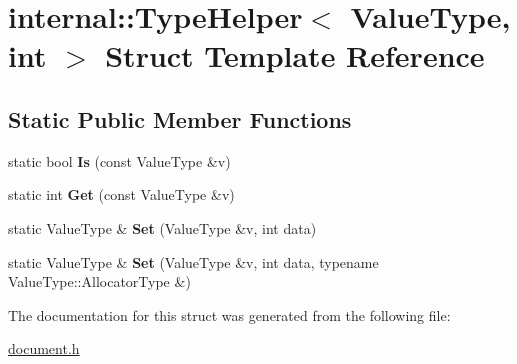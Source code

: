 \hypertarget{a02032}{}\section{internal\+:\+:Type\+Helper$<$ Value\+Type, int $>$ Struct Template Reference}
\label{a02032}
\subsection*{Static Public Member Functions}
\begin{DoxyCompactItemize}
\item 
\mbox{\label{a02032_aa17ef940501aac12fd7934ef979c607e}} 
static bool {\bfseries Is} (const Value\+Type \&v)
\item 
\mbox{\label{a02032_a98c331ac026873b9ad4ba68e7bf28446}} 
static int {\bfseries Get} (const Value\+Type \&v)
\item 
\mbox{\label{a02032_aceea0a0fac6684e53a9d9f66da4154cd}} 
static Value\+Type \& {\bfseries Set} (Value\+Type \&v, int data)
\item 
\mbox{\label{a02032_a2ca21bedcaeaf0fffe913edb2fe1a66a}} 
static Value\+Type \& {\bfseries Set} (Value\+Type \&v, int data, typename Value\+Type\+::\+Allocator\+Type \&)
\end{DoxyCompactItemize}


The documentation for this struct was generated from the following file\+:\begin{DoxyCompactItemize}
\item 
\hyperlink{a00476}{document.\+h}\end{DoxyCompactItemize}
